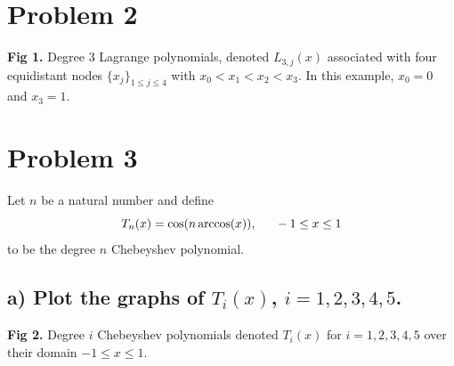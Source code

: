 \documentclass[11pt, letterpaper]{article}
\begin{document}
\section*{Problem 2}
\begin{center}
\end{center}
{\bf Fig 1.} Degree 3 Lagrange polynomials, denoted $L_{3,j}(x)$ associated with four equidistant 
nodes $\{x_j\}_{1\leq j\leq 4}$ with $x_0<x_1<x_2<x_3$. In this example, $x_0=0$ and $x_3=1$.

\section*{Problem 3}
Let $n$ be a natural number and define
\[T_n(x)=\cos(n\arccos(x)),\indent -1\leq x\leq 1\]
to be the degree $n$ Chebeyshev polynomial. 

\subsection*{a) \normalfont Plot the graphs of $T_i(x)$, $i=1,2,3,4,5$.}
\begin{center}    
\end{center}
{\bf Fig 2.} Degree $i$ Chebeyshev polynomials denoted $T_i(x)$ for $i=1,2,3,4,5$ over their domain
$-1\leq x\leq 1$. 
\end{document}
